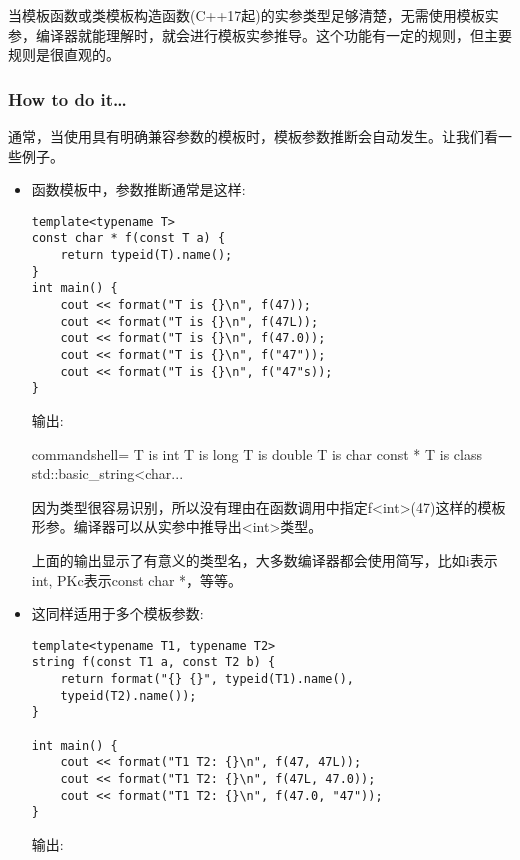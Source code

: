 
当模板函数或类模板构造函数(C++17起)的实参类型足够清楚，无需使用模板实参，编译器就能理解时，就会进行模板实参推导。这个功能有一定的规则，但主要规则是很直观的。

\subsubsection{How to do it…}

通常，当使用具有明确兼容参数的模板时，模板参数推断会自动发生。让我们看一些例子。

\begin{itemize}
\item 
函数模板中，参数推断通常是这样:

\begin{lstlisting}[style=styleCXX]
template<typename T>
const char * f(const T a) {
	return typeid(T).name();
}
int main() {
	cout << format("T is {}\n", f(47));
	cout << format("T is {}\n", f(47L));
	cout << format("T is {}\n", f(47.0));
	cout << format("T is {}\n", f("47"));
	cout << format("T is {}\n", f("47"s));
}
\end{lstlisting}

输出:

\begin{tcblisting}{commandshell={}}
T is int
T is long
T is double
T is char const *
T is class std::basic_string<char...
\end{tcblisting}

因为类型很容易识别，所以没有理由在函数调用中指定f<int>(47)这样的模板形参。编译器可以从实参中推导出<int>类型。

\begin{tcolorbox}[colback=webgreen!5!white,colframe=webgreen!75!black,title=Note]
上面的输出显示了有意义的类型名，大多数编译器都会使用简写，比如i表示int, PKc表示const char *，等等。
\end{tcolorbox}

\item 
这同样适用于多个模板参数:

\begin{lstlisting}[style=styleCXX]
template<typename T1, typename T2>
string f(const T1 a, const T2 b) {
	return format("{} {}", typeid(T1).name(),
	typeid(T2).name());
}

int main() {
	cout << format("T1 T2: {}\n", f(47, 47L));
	cout << format("T1 T2: {}\n", f(47L, 47.0));
	cout << format("T1 T2: {}\n", f(47.0, "47"));
}
\end{lstlisting}

输出:


\end{itemize}
